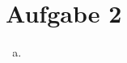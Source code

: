 \documentclass[a4paper]{scrartcl}
\begin{document}
\section*{Aufgabe 2}
\begin{enumerate}[a)]

\item 
\end{enumerate}
\newpage
\end{document}
